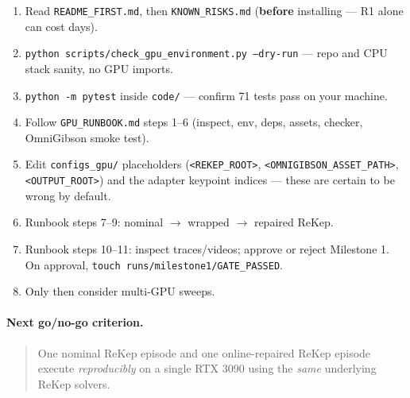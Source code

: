 \documentclass[11pt]{article}
\begin{document}
\begin{enumerate}[leftmargin=2em,itemsep=1pt]
\item Read \texttt{README\_FIRST.md}, then \texttt{KNOWN\_RISKS.md}
      (\textbf{before} installing --- R1 alone can cost days).
\item \texttt{python scripts/check\_gpu\_environment.py --dry-run} --- repo and
      CPU stack sanity, no GPU imports.
\item \texttt{python -m pytest} inside \texttt{code/} --- confirm 71 tests pass
      on your machine.
\item Follow \texttt{GPU\_RUNBOOK.md} steps 1--6 (inspect, env, deps, assets,
      checker, OmniGibson smoke test).
\item Edit \texttt{configs\_gpu/} placeholders (\texttt{<REKEP\_ROOT>},
      \texttt{<OMNIGIBSON\_ASSET\_PATH>}, \texttt{<OUTPUT\_ROOT>}) and the
      adapter keypoint indices --- these are certain to be wrong by default.
\item Runbook steps 7--9: nominal $\to$ wrapped $\to$ repaired ReKep.
\item Runbook steps 10--11: inspect traces/videos; approve or reject Milestone 1.
      On approval, \texttt{touch runs/milestone1/GATE\_PASSED}.
\item Only then consider multi-GPU sweeps.
\end{enumerate}

\paragraph{Next go/no-go criterion.}
\begin{quote}
One nominal ReKep episode and one online-repaired ReKep episode execute
\emph{reproducibly} on a single RTX 3090 using the \emph{same} underlying ReKep
solvers.
\end{quote}
\end{document}
